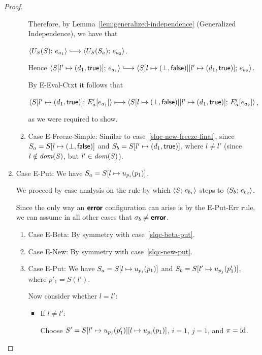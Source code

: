 \begin{proof}
\begin{enumerate}
\begin{enumerate}
      Therefore, by Lemma~\ref{lem:generalized-independence}
      (Generalized Independence), we have that

      $\config{U_S(S)}{e_{a_1}} \parstepsto
      \config{U_S(S_a)}{e_{a_2}}$.

      Hence $\config{\extS{S}{l'}{d_1}{\frozentrue}}{e_{a_1}}
      \parstepsto
      \config{\extS{\extS{S}{l}{\bot}{\frozenfalse}}{l'}{d_1}{\frozentrue}}{e_{a_2}}$.

      By {\sc E-Eval-Ctxt} it follows that

      $\langle S[l' \mapsto (d_1, \textsf{true})];\, E'_a\hspace{-0.5mm}\left[e_{a_1}\right] \rangle
      \longmapsto
      \langle S[l \mapsto (\bot, \textsf{false})][l' \mapsto (d_1, \textsf{true})];\, E'_a\hspace{-0.5mm}\left[e_{a_2}\right] \rangle$,

      as we were required to show.

    \item \label{slqc-new-freeze-simple}Case {\sc E-Freeze-Simple}:
      Similar to case~\ref{slqc-new-freeze-final}, since $S_a =
      S[l \mapsto (\bot, \textsf{false})]$ and $S_b =
      S[l' \mapsto (d_1, \textsf{true})]$, where $l \neq l'$ (since $l
      \notin \mathit{dom}(S)$, but $l' \in \mathit{dom}(S)$).

    \end{enumerate}
  \item Case {\sc E-Put}: We have $S_a =
    S[l \mapsto u_{p_i}(p_1)]$.

    We proceed by case analysis on the rule by which
    $\langle S;\, e_{b_1} \rangle$ steps to $\langle S_b;\, e_{b_2} \rangle$.

    Since the only way an $\textbf{\textsf{error}}$ configuration can arise is by the
    {\sc E-Put-Err} rule, we can assume in all other cases that
    $\sigma_b \neq \textbf{\textsf{error}}$.
    \begin{enumerate}
    \item \label{slqc-put-beta}Case {\sc E-Beta}: By symmetry with case~\ref{slqc-beta-put}.
    \item \label{slqc-put-new}Case {\sc E-New}: By symmetry with case~\ref{slqc-new-put}.
    \item \label{slqc-put-put}Case {\sc E-Put}: We have $S_a =
      S[l \mapsto u_{p_i}(p_1)]$ and $S_b =
      S[l' \mapsto u_{p_j}(p'_1)]$, where $p'_1 = S(l')$.

      Now consider whether $l = l'$:
      \begin{itemize}
      \item If $l \neq l'$:

        Choose $S' =
        S[l' \mapsto u_{p_j}(p'_1)][l \mapsto u_{p_i}(p_1)]$,
        $i = 1$, $j = 1$, and $\pi = \mathrm{id}$.


\end{itemize}
\end{enumerate}
\end{enumerate}
\end{proof}
